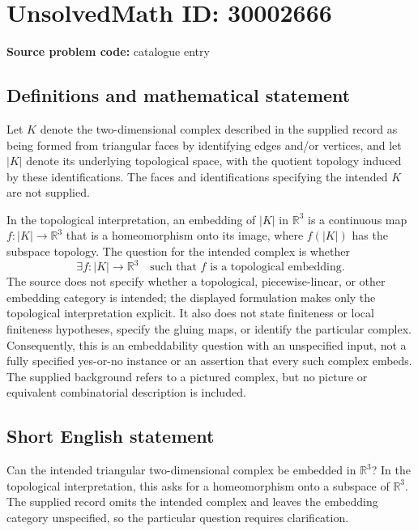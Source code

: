 \documentclass[11pt]{article}
\newcommand{\R}{\mathbb{R}}
\begin{document}
\section*{UnsolvedMath ID: 30002666}
\textbf{Source problem code:} catalogue entry
\subsection{Definitions and mathematical statement}
Let \(K\) denote the two-dimensional complex described in the supplied record as being formed from triangular faces by identifying edges and/or vertices, and let \(|K|\) denote its underlying topological space, with the quotient topology induced by these identifications. The faces and identifications specifying the intended \(K\) are not supplied.

In the topological interpretation, an embedding of \(|K|\) in \(\R^3\) is a continuous map \(f:|K|\to\R^3\) that is a homeomorphism onto its image, where \(f(|K|)\) has the subspace topology. The question for the intended complex is whether
\[
\exists f:|K|\longrightarrow\R^3
\quad\text{such that }f\text{ is a topological embedding}.
\]
The source does not specify whether a topological, piecewise-linear, or other embedding category is intended; the displayed formulation makes only the topological interpretation explicit. It also does not state finiteness or local finiteness hypotheses, specify the gluing maps, or identify the particular complex. Consequently, this is an embeddability question with an unspecified input, not a fully specified yes-or-no instance or an assertion that every such complex embeds. The supplied background refers to a pictured complex, but no picture or equivalent combinatorial description is included.
\subsection{Short English statement}
Can the intended triangular two-dimensional complex be embedded in \(\R^3\)? In the topological interpretation, this asks for a homeomorphism onto a subspace of \(\R^3\). The supplied record omits the intended complex and leaves the embedding category unspecified, so the particular question requires clarification.
\end{document}

